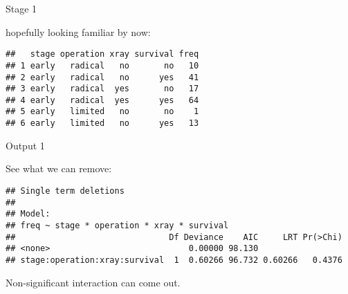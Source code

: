 \begin{frame}[fragile]{Stage 1}

hopefully looking familiar by now:

 
\begin{knitrout}
\color{fgcolor}\begin{kframe}
\begin{alltt}
\hlkwb{=}\hlstd{(}\hlstd{,}
\end{alltt}
\begin{verbatim}
##   stage operation xray survival freq
## 1 early   radical   no       no   10
## 2 early   radical   no      yes   41
## 3 early   radical  yes       no   17
## 4 early   radical  yes      yes   64
## 5 early   limited   no       no    1
## 6 early   limited   no      yes   13
\end{verbatim}
\begin{alltt}
\hlkwb{=}\hlopt{~}\hlopt{*}\hlopt{*}\hlopt{*}
    \hlstd{=}\hlstd{)}
\end{alltt}
\end{kframe}
\end{knitrout}


\end{frame}

\begin{frame}[fragile]{Output 1}

See what we can remove:

{\footnotesize
\begin{knitrout}
\color{fgcolor}\begin{kframe}
\begin{alltt}
\hlstd{=}\hlstd{)}
\end{alltt}
\begin{verbatim}
## Single term deletions
## 
## Model:
## freq ~ stage * operation * xray * survival
##                               Df Deviance    AIC     LRT Pr(>Chi)
## <none>                            0.00000 98.130                 
## stage:operation:xray:survival  1  0.60266 96.732 0.60266   0.4376
\end{verbatim}
\end{kframe}
\end{knitrout}
}

Non-significant interaction can come out.
  
\end{frame}


